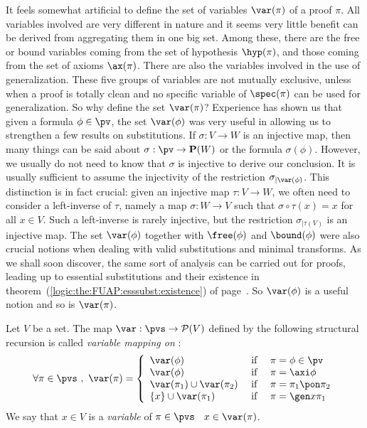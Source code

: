 It feels somewhat artificial to define the set of variables
$\var(\pi)$ of a proof $\pi$. All variables involved are very
different in nature and it seems very little benefit can be derived
from aggregating them in one big set. Among these, there are the
free or bound variables coming from the set of hypothesis
$\hyp(\pi)$, and those coming from the set of axioms $\ax(\pi)$.
There are also the variables involved in the use of generalization.
These five groups of variables are not mutually exclusive, unless
when a proof is totally clean and no specific variable of
$\spec(\pi)$ can be used for generalization. So why define the set
$\var(\pi)$? Experience has shown us that given a formula
$\phi\in\pv$, the set $\var(\phi)$ was very useful in allowing us to
strengthen a few results on substitutions. If $\sigma:V\to W$ is an
injective map, then many things can be said about $\sigma:\pv\to{\bf
P}(W)$ or the formula $\sigma(\phi)$. However, we usually do not
need to know that $\sigma$ is injective to derive our conclusion. It
is usually sufficient to assume the injectivity of the restriction
$\sigma_{|\var(\phi)}$. This distinction is in fact crucial: given
an injective map $\tau:V\to W$, we often need to consider a
left-inverse of $\tau$, namely a map $\sigma:W\to V$ such that
$\sigma\circ\tau(x)=x$ for all $x\in V$. Such a left-inverse is
rarely injective, but the restriction $\sigma_{|\tau(V)}$ is an
injective map. The set $\var(\phi)$ together with $\free(\phi)$ and
$\bound(\phi)$ were also crucial notions when dealing with valid
substitutions and minimal transforms. As we shall soon discover, the
same sort of analysis can be carried out for proofs, leading up to
essential substitutions and their existence in
theorem~(\ref{logic:the:FUAP:esssubst:existence}) of
page~\pageref{logic:the:FUAP:esssubst:existence}. So $\var(\phi)$ is
a useful notion and so is $\var(\pi)$. 
\begin{defin}\label{logic:def:FUAP:variable:variable}
Let $V$ be a set. The map $\var:\pvs\to {\cal P}(V)$ defined by the
following structural recursion is called {\em variable mapping on
\pvs}:
 \begin{equation}\label{logic:eqn:FUAP:variable:variable:1}
    \forall\pi\in\pvs\ ,\ \var(\pi)=\left\{
                    \begin{array}{lcl}
                    \var(\phi)&\mbox{\ if\ }&\pi=\phi\in\pv\\
                    \var(\phi)&\mbox{\ if\ }&\pi=\axi\phi\\
                    \var(\pi_{1})\cup\var(\pi_{2}) &\mbox{\ if\ }&\pi=\pi_{1}\pon\pi_{2}\\
                    \{x\}\cup\var(\pi_{1})&\mbox{\ if\ }&\pi=\gen x\pi_{1}
                    \end{array}\right.
    \end{equation}
We say that $x\in V$ is a {\em variable} of $\pi\in\pvs$ \ifand\
$x\in\var(\pi)$.
\end{defin}
